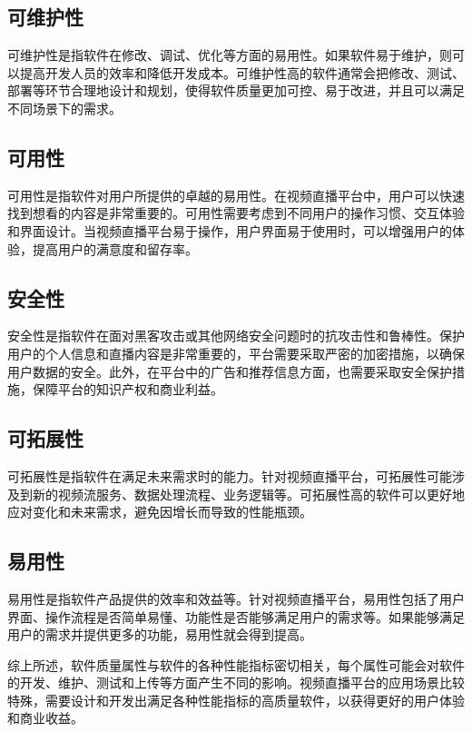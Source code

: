 \subsection{可维护性}

可维护性是指软件在修改、调试、优化等方面的易用性。如果软件易于维护，则可以提高开发人员的效率和降低开发成本。可维护性高的软件通常会把修改、测试、部署等环节合理地设计和规划，使得软件质量更加可控、易于改进，并且可以满足不同场景下的需求。

\subsection{可用性}

可用性是指软件对用户所提供的卓越的易用性。在视频直播平台中，用户可以快速找到想看的内容是非常重要的。可用性需要考虑到不同用户的操作习惯、交互体验和界面设计。当视频直播平台易于操作，用户界面易于使用时，可以增强用户的体验，提高用户的满意度和留存率。


\subsection{安全性}

安全性是指软件在面对黑客攻击或其他网络安全问题时的抗攻击性和鲁棒性。保护用户的个人信息和直播内容是非常重要的，平台需要采取严密的加密措施，以确保用户数据的安全。此外，在平台中的广告和推荐信息方面，也需要采取安全保护措施，保障平台的知识产权和商业利益。

\subsection{可拓展性}

可拓展性是指软件在满足未来需求时的能力。针对视频直播平台，可拓展性可能涉及到新的视频流服务、数据处理流程、业务逻辑等。可拓展性高的软件可以更好地应对变化和未来需求，避免因增长而导致的性能瓶颈。

\subsection{易用性}

易用性是指软件产品提供的效率和效益等。针对视频直播平台，易用性包括了用户界面、操作流程是否简单易懂、功能性是否能够满足用户的需求等。如果能够满足用户的需求并提供更多的功能，易用性就会得到提高。

综上所述，软件质量属性与软件的各种性能指标密切相关，每个属性可能会对软件的开发、维护、测试和上传等方面产生不同的影响。视频直播平台的应用场景比较特殊，需要设计和开发出满足各种性能指标的高质量软件，以获得更好的用户体验和商业收益。


